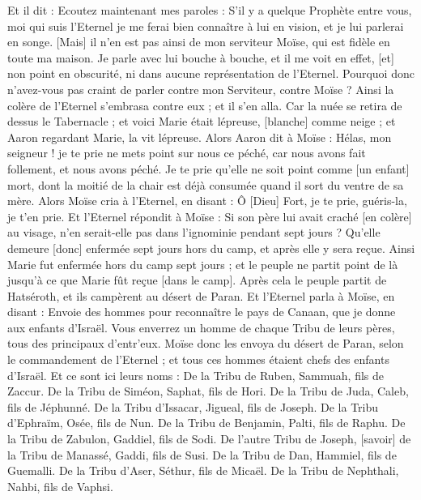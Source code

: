 \begin{multicols}{2}
Et il dit : Ecoutez maintenant mes paroles : S'il y a quelque Prophète entre vous, moi qui suis l'Eternel je me ferai bien connaître à lui en vision, et je lui parlerai en songe.
[Mais] il n'en est pas ainsi de mon serviteur Moïse, qui est fidèle en toute ma maison.
Je parle avec lui bouche à bouche, et il me voit en effet, [et] non point en obscurité, ni dans aucune représentation de l'Eternel. Pourquoi donc n'avez-vous pas craint de parler contre mon Serviteur, contre Moïse ?
Ainsi la colère de l'Eternel s'embrasa contre eux ; et il s'en alla.
Car la nuée se retira de dessus le Tabernacle ; et voici Marie était lépreuse, [blanche] comme neige ; et Aaron regardant Marie, la vit lépreuse.
Alors Aaron dit à Moïse : Hélas, mon seigneur ! je te prie ne mets point sur nous ce péché, car nous avons fait follement, et nous avons péché.
Je te prie qu'elle ne soit point comme [un enfant] mort, dont la moitié de la chair est déjà consumée quand il sort du ventre de sa mère.
Alors Moïse cria à l'Eternel, en disant : Ô [Dieu] Fort, je te prie, guéris-la, je t'en prie.
Et l'Eternel répondit à Moïse : Si son père lui avait craché [en colère] au visage, n'en serait-elle pas dans l'ignominie pendant sept jours ? Qu'elle demeure [donc] enfermée sept jours hors du camp, et après elle y sera reçue.
Ainsi Marie fut enfermée hors du camp sept jours ; et le peuple ne partit point de là jusqu'à ce que Marie fût reçue [dans le camp].
\VerseOne{}Après cela le peuple partit de Hatséroth, et ils campèrent au désert de Paran.
Et l'Eternel parla à Moïse, en disant :
Envoie des hommes pour reconnaître le pays de Canaan, que je donne aux enfants d'Israël. Vous enverrez un homme de chaque Tribu de leurs pères, tous des principaux d'entr'eux.
Moïse donc les envoya du désert de Paran, selon le commandement de l'Eternel ; et tous ces hommes étaient chefs des enfants d'Israël.
Et ce sont ici leurs noms : De la Tribu de Ruben, Sammuah, fils de Zaccur.
De la Tribu de Siméon, Saphat, fils de Hori.
De la Tribu de Juda, Caleb, fils de Jéphunné.
De la Tribu d'Issacar, Jigueal, fils de Joseph.
De la Tribu d'Ephraïm, Osée, fils de Nun.
De la Tribu de Benjamin, Palti, fils de Raphu.
De la Tribu de Zabulon, Gaddiel, fils de Sodi.
De l'autre Tribu de Joseph, [savoir] de la Tribu de Manassé, Gaddi, fils de Susi.
De la Tribu de Dan, Hammiel, fils de Guemalli.
De la Tribu d'Aser, Séthur, fils de Micaël.
De la Tribu de Nephthali, Nahbi, fils de Vaphsi.

\end{multicols}
